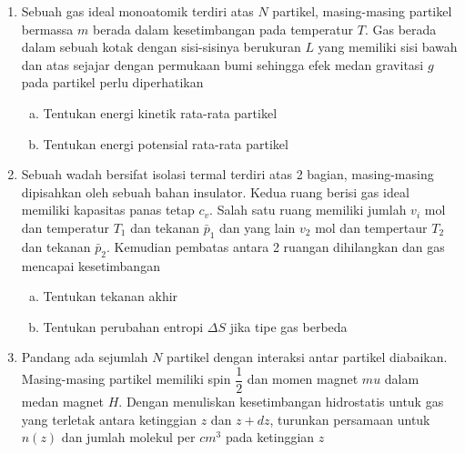 \begin{enumerate}
    \item  Sebuah gas ideal monoatomik terdiri atas $N$ partikel, masing-masing partikel bermassa $m$
    berada dalam kesetimbangan pada temperatur $T$. Gas berada dalam sebuah kotak dengan
    sisi-sisinya berukuran $L$ yang memiliki sisi bawah dan atas sejajar dengan permukaan bumi
    sehingga efek medan gravitasi $g$ pada partikel perlu diperhatikan
    \begin{enumerate}[(a)]
        \item Tentukan energi kinetik rata-rata partikel
        \item Tentukan energi potensial rata-rata partikel
    \end{enumerate}
    \item Sebuah wadah bersifat isolasi termal terdiri atas 2 bagian, masing-masing dipisahkan oleh sebuah bahan insulator. Kedua ruang berisi gas ideal memiliki kapasitas panas tetap $c_v$. Salah satu ruang memiliki jumlah $v_i$ mol dan temperatur $T_1$ dan tekanan $\bar{p}_1$ dan yang lain $v_2$ mol dan tempertaur $T_2$ dan tekanan $\bar{p}_2$. Kemudian pembatas antara 2 ruangan dihilangkan dan gas mencapai kesetimbangan
    \begin{enumerate}[(a)]
        \item Tentukan tekanan akhir
        \item Tentukan perubahan entropi $\Delta S$ jika tipe gas berbeda
    \end{enumerate} 
    \item Pandang ada sejumlah $N$ partikel dengan interaksi antar partikel diabaikan. Masing-masing
    partikel memiliki spin $\dfrac{1}{2}$ dan momen magnet $mu$ dalam medan magnet $H$. Dengan menuliskan kesetimbangan hidrostatis untuk gas yang terletak antara ketinggian $z$ dan $z+dz$, turunkan persamaan untuk $n(z)$ dan jumlah molekul per $cm^3$ pada ketinggian $z$
\end{enumerate}